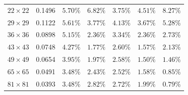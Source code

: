 \documentclass[VANCOUVER]{USG}
\begin{document}
\begin{table}[!t]
{\begin{tabular}{ccccccc}
            $22 \times 22$                                                                                    & 0.1496                                       & $5.70\%$                               & $6.82\%$                        & $\mathbf{3.75\%}$                      & $4.51\%$                               & $8.27\%$                               \\
            $29 \times 29$                                                                                    & 0.1122                                       & $5.61\%$                               & $3.77\%$                        & $4.13\%$                               & $\mathbf{3.67\%}$                      & $5.28\%$                               \\
            $36 \times 36$                                                                                    & 0.0898                                       & $5.15\%$                               & $\mathbf{2.36\%}$               & $3.34\%$                               & $\mathbf{2.36\%}$                      & $2.73\%$                               \\
            $43 \times 43$                                                                                    & 0.0748                                       & $4.27\%$                               & $1.77\%$                        & $2.60\%$                               & $\mathbf{1.57\%}$                      & $2.13\%$                               \\
            $49 \times 49$                                                                                    & 0.0654                                       & $3.95\%$                               & $1.97\%$                        & $2.58\%$                               & $1.50\%$                               & $\mathbf{1.46\%}$                      \\
            $65 \times 65$                                                                                    & 0.0491                                       & $3.48\%$                               & $2.43\%$                        & $2.52\%$                               & $1.58\%$                               & $\mathbf{0.85\%}$                      \\
            $81 \times 81$                                                                                    & 0.0393                                       & $3.48\%$                               & $2.82\%$                        & $2.72\%$                               & $1.99\%$                               & $\mathbf{0.79\%}$                      \\

\end{tabular}}
\end{table}
\end{document}
